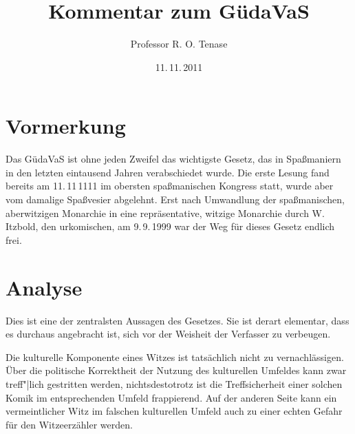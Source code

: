 \documentclass{scrartcl}
\begin{document}
\title{Kommentar zum GüdaVaS}
\author{Professor R. O. Tenase}
\date{11.\,11.\,2011}
\maketitle
\tableofcontents

\section{Vormerkung}
Das GüdaVaS ist ohne jeden Zweifel das wichtigste Gesetz, das in
Spaßmaniern in den letzten eintausend Jahren verabschiedet wurde. 
Die erste Lesung fand bereits am 11.\,11\,1111 im obersten 
spaßmanischen Kongress statt, wurde aber vom damalige Spaßvesier
abgelehnt. Erst nach Umwandlung der spaßmanischen, aberwitzigen Monarchie
in eine repräsentative, witzige Monarchie durch W. Itzbold, den
urkomischen, am 9.\,9.\,1999 war der Weg für dieses Gesetz endlich frei.

\section{Analyse}

\begin{addmargin}[0pt]{.333\textwidth}
  Dies ist eine der zentralsten Aussagen des Gesetzes. Sie ist derart
  elementar, dass es durchaus angebracht ist, sich vor der Weisheit der
  Verfasser zu verbeugen.

  \syncwithnotecolumn[paragraphs]\bigskip
  Die kulturelle Komponente eines Witzes ist tatsächlich nicht zu
  vernachlässigen. Über die politische Korrektheit der Nutzung des kulturellen
  Umfeldes kann zwar treff"|lich gestritten werden, nichtsdestotrotz ist die
  Treffsicherheit einer solchen Komik im entsprechenden Umfeld frappierend. Auf
  der anderen Seite kann ein vermeintlicher Witz im falschen kulturellen
  Umfeld auch zu einer echten Gefahr für den Witzeerzähler werden.
\end{addmargin}
\end{document}
